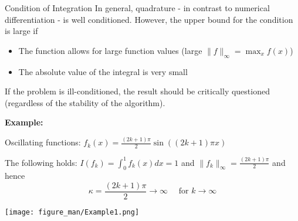 \documentclass[11pt,compress,t,notes=noshow, xcolor=table]{beamer}
\begin{document}
\begin{vbframe}{Condition of Integration}
In general, quadrature - in contrast to numerical differentiation - is well conditioned.
However, the upper bound for the condition is large if

\begin{itemize}
\item The function allows for large function values (large $\|f\|_\infty = \max_x f(x)$)
\item The absolute value of the integral is very small
\end{itemize}

If the problem is ill-conditioned, the result should be critically questioned (regardless of the stability of the algorithm).

\framebreak

\textbf{Example:}

Oscillating functions: $f_k(x) = \frac{(2k + 1)\pi}{2}\sin((2k+1)\pi x)$

\lz

The following holds: $I(f_k) = \int_0^1 f_k(x) dx = 1$ and $\|f_k\|_\infty = \frac{(2k+1)\pi}{2}$ and hence
\vspace{-0.1cm}
$$
\kappa = \frac{(2k+1)\pi}{2} \to \infty \quad \text{ for } k \to \infty
$$

\begin{center}
\texttt{[image: figure\_man/Example1.png]}
\end{center}

%
%



\end{vbframe}
\end{document}
